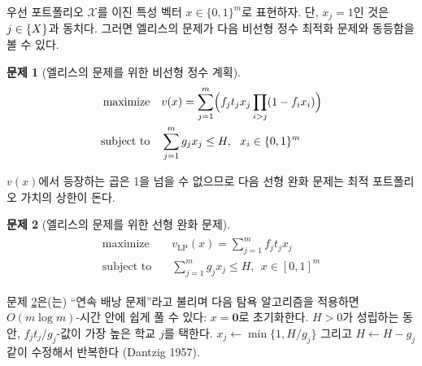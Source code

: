 \documentclass[11pt]{article} %
\newif\ifen
\theoremstyle{definition}
\newtheorem{problem}{Problem}
\theoremstyle{definition}
\newtheorem{problem}{문제}
\begin{document}
\ifen
To begin, let us characterize the portfolio $\mathcal{X}$ as the binary vector $x \in \{0, 1\}^m$, where $x_j = 1 $ if and only if $j \in \mathcal\{X\}$. Then it is not difficult to see that Ellis's problem is equivalent to the following integer nonlinear program. 
\else
우선 포트폴리오 $\mathcal{X}$를 이진 특성 벡터 $x \in \{0, 1\}^m$로 표현하자. 단, $x_j = 1 $인 것은 $j \in \mathcal\{X\}$과 동치다. 그러면 엘리스의 문제가 다음 비선형 정수 최적화 문제와 동등함을 볼 수 있다.
\fi
\begin{problem}[\ifen Integer NLP for Ellis's problem\else 엘리스의 문제를 위한 비선형 정수 계획\fi] \label{integernlp}
\begin{align}
\begin{split}
\text{maximize}\quad &  v(x) = \sum_{j=1}^m \Bigl(f_j t_j  x_j \prod_{i > j} (1 - f_{i} x_i) \Bigr)\\
\text{subject to}\quad & \sum_{j=1}^m g_j x_j \leq H, ~~ x_i \in \{0, 1\}^m
\end{split}
\end{align}
\end{problem}
\ifen
Since the product in $v(x)$ does not exceed one, the following LP relaxation is an upper bound on the valuation of the optimal portfolio.
\else
$v(x)$에서 등장하는 곱은 1을 넘을 수 없으므로 다음 선형 완화 문제는 최적 포트폴리오 가치의 상한이 돈다.
\fi
\begin{problem}[\ifen LP relaxation for Ellis's problem\else 엘리스의 문제를 위한 선형 완화 문제\fi] \label{LPrelaxation}
\begin{align}
\begin{split}
\text{maximize}\quad &  v_{\mathrm{LP}}(x) = \sum_{j=1}^m  f_j t_j x_j \\
\text{subject to}\quad & \sum_{j=1}^m g_j x_j \leq H, ~~ x \in [0, 1]^m
\end{split}
\end{align}
\end{problem}
\ifen
Problem \ref{LPrelaxation} is a continuous knapsack problem, which is easily solved in $O(m \log m)$-time by the following greedy algorithm: Start with $x = \mathbf{0}$. While $H > 0$, select the school $j$ for which $f_j t_j / g_j$ is highest, set $x_j \gets \min\{1, H / g_j\}$, and set $H \gets H - g_j$ (Dantzig 1957).  
\else
문제 \ref{LPrelaxation}은(는) ``연속 배낭 문제''라고 불리며 다음 탐욕 알고리즘을 적용하면 $O(m \log m)$-시간 안에 쉽게 풀 수 있다: $x = \mathbf{0}$로 초기화한다. $H > 0$가 성립하는 동안, $f_j t_j / g_j$-값이 가장 높은 학교 $j$를 택한다. $x_j \gets \min\{1, H / g_j\}$ 그리고 $H \gets H - g_j$ 같이 수정해서 반복한다 (Dantzig 1957).
\fi
\end{document}
